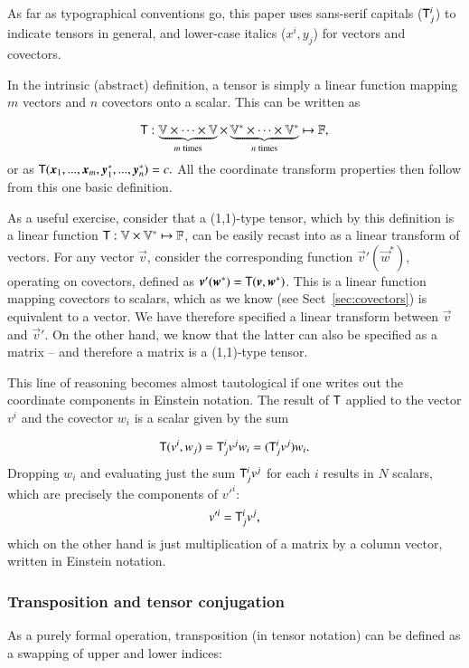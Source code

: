 \documentclass[]{aa}
\begin{document}
As far as typographical conventions go, this paper uses sans-serif capitals ($\mathsf{T}_j^i$) to indicate tensors in general, and lower-case italics ($x^i, y_j$) for vectors and covectors.

In the intrinsic (abstract) definition, a tensor is simply a linear function mapping $m$ vectors and $n$ covectors onto a scalar. This can be written as

\[
  \mathsf{T}: \underbrace{\mathbb{V}\times\cdots\times\mathbb{V}}_{m\;\mathrm{times}}\times
  \underbrace{\mathbb{V}^*\times\cdots\times\mathbb{V}^*}_{n\;\mathrm{times}} \mapsto \mathbb{F},
\]
or as $\tens{T}(\vec x_1,...,\vec x_m,\vec y^*_1,...,\vec y^*_n)=c.$ All the coordinate transform properties then follow from this one basic definition.

As a useful exercise, consider that a (1,1)-type tensor, which by this definition is a linear function $\mathsf{T}:\mathbb{V}\times\mathbb{V}^* \mapsto \mathbb{F}$, can be easily recast into as a linear transform of vectors. For any vector $\vec v$, consider the corresponding function $\vec v'(\vec w^*)$, operating on covectors, defined as $\vec v'(\vec w^*)= \tens{T}(\vec v,\vec w^*)$. This is a linear function mapping covectors to scalars, which as we know (see Sect~\ref{sec:covectors}) is equivalent to a vector. We have therefore specified a linear transform between $\vec v$ and $\vec v'$. On the other hand, we know that the latter can also be specified as a matrix -- and therefore a matrix is a (1,1)-type tensor. 

This line of reasoning becomes almost tautological if one writes out the coordinate components in Einstein notation. The result of $\mathsf{T}$ applied to the vector $v^i$ and the covector $w_i$ is a scalar given by the sum

\[
  \mathsf{T}(v^i,w_j) = \mathsf{T}^i_j v^j w_i = ( \mathsf{T}^i_j v^j ) w_i.
\]
Dropping $w_i$ and evaluating just the sum $\mathsf{T}^i_j v^j$ for each $i$ results in $N$ scalars, which are precisely the components of $v'^i$:
\[
  v'^i = \mathsf{T}^i_j v^j,
\]
which on the other hand is just multiplication of a matrix by a column vector, written in Einstein notation.

\subsubsection{Transposition and tensor conjugation}
\label{sec:tensor-transposition}

As a purely formal operation, transposition (in tensor notation) can be defined as a swapping of upper and lower indices:
\end{document}
